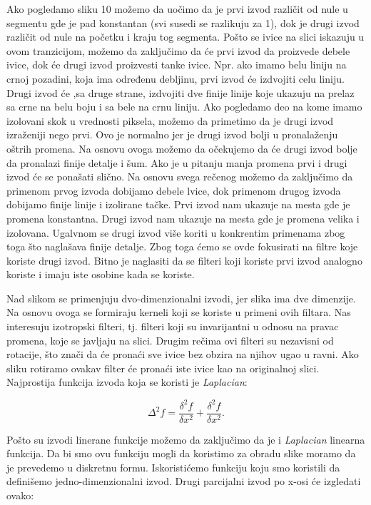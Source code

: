 \documentclass[a4paper,12pt,titlepage]{article}
\begin{document}
Ako pogledamo sliku 10 možemo da uočimo da je prvi izvod različit od nule u segmentu gde je pad konstantan (svi susedi se razlikuju za 1), dok je drugi izvod različit od nule na početku i kraju tog segmenta. Pošto se ivice na slici iskazuju u ovom tranzicijom, možemo da zaključimo da će prvi izvod da proizvede debele ivice, dok će drugi izvod proizvesti tanke ivice. Npr. ako imamo belu liniju na crnoj pozadini, koja ima određenu debljinu, prvi izvod će izdvojiti celu liniju. Drugi izvod će ,sa druge strane, izdvojiti dve finije linije koje ukazuju na prelaz sa crne na belu boju i sa bele na crnu liniju. Ako pogledamo deo na kome imamo izolovani skok u vrednosti piksela, možemo da primetimo da je drugi izvod izraženiji nego prvi. Ovo je normalno jer je drugi izvod bolji u pronalaženju oštrih promena. Na osnovu ovoga možemo da očekujemo da će drugi izvod bolje da pronalazi finije detalje i šum. Ako je u pitanju manja promena prvi i drugi izvod će se ponašati slično. Na osnovu svega rečenog možemo da zaključimo da primenom prvog izvoda dobijamo debele lvice, dok primenom drugog izvoda dobijamo finije linije i izolirane tačke. Prvi izvod nam ukazuje na mesta gde je promena konstantna. Drugi izvod nam ukazuje na mesta gde je promena velika i izolovana. Ugalvnom se drugi izvod više koriti u konkrentim primenama zbog toga što naglašava finije detalje. Zbog toga ćemo se ovde fokusirati na filtre koje koriste drugi izvod. Bitno je naglasiti da se filteri koji koriste prvi izvod analogno koriste i imaju iste osobine kada se koriste.

Nad slikom se primenjuju dvo-dimenzionalni izvodi, jer slika ima dve dimenzije. Na osnovu ovoga se formiraju kerneli koji se koriste u primeni ovih filtara. Nas interesuju izotropski filteri, tj. filteri koji su invarijantni u odnosu na pravac promena, koje se javljaju na slici. Drugim rečima ovi filteri su nezavisni od rotacije, što znači da će pronaći sve ivice bez obzira na njihov ugao u ravni. Ako sliku rotiramo ovakav filter će pronaći iste ivice kao na originalnoj slici. Najprostija funkcija izvoda koja se koristi je \emph{Laplacian}: 

\begin{equation}\label{eq:grad}
\Delta^{2}f = \dfrac{\delta^{2}f}{\delta x^{2}} + \dfrac{\delta^{2}f}{\delta x^{2}}. 
\end{equation}

Pošto su izvodi linerane funkcije možemo da zaključimo da je i \emph{Laplacian} linearna funkcija. Da bi smo ovu funkciju mogli da koristimo za obradu slike moramo da je prevedemo u diskretnu formu. Iskoristićemo funkciju koju smo koristili da definišemo jedno-dimenzionalni izvod. Drugi parcijalni izvod po x-osi će izgledati ovako:
\end{document}
